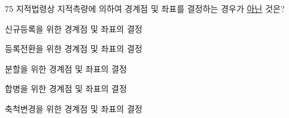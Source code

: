 \begin{question}{75}
지적법령상 지적측량에 의하여 경계점 및 좌표를 결정하는 경우가 \uline{아닌} 것은?
\begin{choices}
  \item 신규등록을 위한 경계점 및 좌표의 결정
  \item 등록전환을 위한 경계점 및 좌표의 결정
  \item 분할을 위한 경계점 및 좌표의 결정
  \item 합병을 위한 경계점 및 좌표의 결정
  \item 축척변경을 위한 경계점 및 좌표의 결정
\end{choices}
\end{question}
